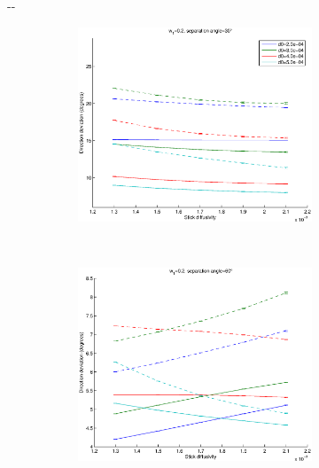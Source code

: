 \documentclass{article}
\begin{document}
\begin{figure}[H]
  \begin{adjustwidth}{-\oddsidemargin}{-\rightmargin}
    \begin{subfigure}{0.8\paperwidth}
      \begin{subfigure}{0.3\textwidth}
        \centering
        \includegraphics[width=\textwidth]{figures/synth_bas_diffus__snr=20__w1=2__angle=30.eps}
      \end{subfigure}
      ~
      \begin{subfigure}{0.3\textwidth}
        \centering
        \includegraphics[width=\textwidth]{figures/synth_bas_diffus__snr=20__w1=2__angle=60.eps}

\end{subfigure}
\end{subfigure}
\end{adjustwidth}
\end{figure}
\end{document}
